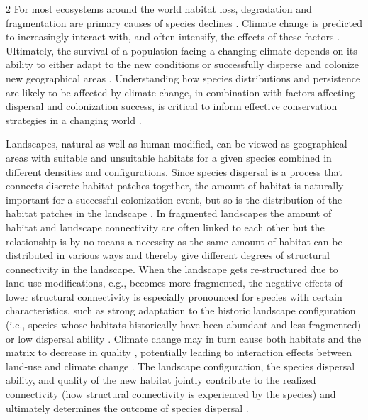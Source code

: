 \documentclass[12pt,pdftex]{article}
\begin{document}
\begin{spacing}{2}
For most ecosystems around the world habitat loss, degradation and fragmentation are primary causes of species declines \citep{Fahrig2003, JoernFischer2006}. Climate change is predicted to increasingly interact with, and often intensify, the effects of these factors \citep{Doerr2011}. Ultimately, the survival of a population facing a changing climate depends on its ability to either adapt to the new conditions \citep{Hoffmann2011,Sentis2015} or successfully disperse and colonize new geographical areas \citep{Travis2013}.  Understanding how species distributions and persistence are likely to be affected by climate change, in combination with factors affecting dispersal and colonization success, is critical to inform effective conservation strategies in a changing world \citep{Gillson2013a}. 

Landscapes, natural as well as human-modified, can be viewed as geographical areas with suitable and unsuitable habitats for a given species combined in different densities and configurations. Since species dispersal is a process that connects discrete habitat patches together, the amount of habitat is naturally important for a successful colonization event, but so is the distribution of the habitat patches in the landscape \citep{Villard1999, Baguette2013}. In fragmented landscapes the amount of habitat and landscape connectivity are often linked to each other \citep{Villard2014} but the relationship is by no means a necessity \citep{Wang2014} as the same amount of habitat can be distributed in various ways and thereby give different degrees of structural connectivity in the landscape. When the landscape gets re-structured due to land-use modifications, e.g., becomes more fragmented, the negative effects of lower structural connectivity is especially pronounced for species with certain characteristics, such as strong adaptation to the historic landscape configuration (i.e., species whose habitats historically have been abundant and less fragmented) or low dispersal ability \citep{Martin2016}. Climate change may in turn cause both habitats and the matrix to decrease in quality \citep{Martin2016}, potentially leading to interaction effects between land-use and climate change \citep{Pielke2005}. The landscape configuration, the species dispersal ability, and quality of the new habitat jointly contribute to the realized connectivity (how structural connectivity is experienced by the species) and ultimately determines the outcome of species dispersal \citep{Baguette2013, Borthagaray2014}. 



\end{spacing}
\end{document}
